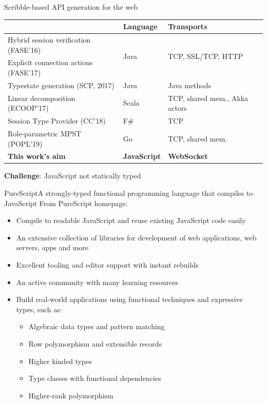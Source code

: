 \documentclass[aspectratio=1610]{beamer}
\begin{document}
\begin{frame}{Scribble-based API generation for the web}
  \begin{table}
  \begin{tabular}{lll}
    \toprule
    & Language & Transports\\
    \midrule
    Hybrid session verification (FASE'16)  & \multirow{2}{*}{Java} &\multirow {2}{*}{\small TCP, SSL/TCP, HTTP}\\
    Explicit connection actions (FASE'17)  &      &\\
    Typestate generation (SCP, 2017)       & Java &\small Java methods\\
    Linear decomposition (ECOOP'17)        & Scala&\small TCP, shared mem., Akka actors\\
    Session Type Provider (CC'18)          & F\#  &\small TCP\\
    Role-parametric MPST (POPL'19)         & Go   &\small TCP, shared mem.\\
    \rowcolor{yellow!10} \textbf{This work's aim}  & \textbf{JavaScript} &\small \textbf{WebSocket} \\
    \bottomrule
  \end{tabular}
  \end{table}

  \textbf{Challenge}: JavaScript not statically typed
\end{frame}

\begin{frame}{PureScript}{A strongly-typed functional programming language that compiles to JavaScript}
  From PureScript homepage:
  \begin{itemize}
    \item \alert<2>{Compile to readable JavaScript} and reuse existing JavaScript code easily
    \item An extensive collection of libraries for development of web applications, web servers, apps and more
    \item Excellent tooling and editor support with instant rebuilds
    \item An active community with many learning resources
    \item Build real-world applications using functional techniques and expressive types, such as:
      \begin{itemize}
        \item Algebraic data types and pattern matching
        \item \alert<2>{Row polymorphism} and extensible records
        \item Higher kinded types
        \item \alert<2>{Type classes with functional dependencies}
        \item Higher-rank polymorphism
      \end{itemize}
  \end{itemize}
\end{frame}
\end{document}
